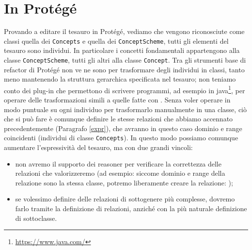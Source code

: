 \section{In Protégé}
Provando a editare il tesauro in Protégé, vediamo che vengono riconosciute come classi quella dei \verb|Concepts| e quella dei \verb|ConceptScheme|, tutti gli elementi del tesauro sono individui. In particolare i concetti fondamentali appartengono alla classe \verb|ConceptScheme|, tutti gli altri alla classe \verb|Concept|. Tra gli strumenti base di refactor di Protégé non ve ne sono per trasformare degli individui in classi, tanto meno mantenendo la struttura gerarchica specificata nel tesauro; non teniamo conto dei plug-in che permettono di scrivere programmi, ad esempio in java\footnote{\url{https://www.java.com/}}, per operare delle trasformazioni simili a quelle fatte con \cduce. Senza voler operare in modo puntuale su ogni individuo per trasformarlo manualmente in una classe, ciò che si può fare è comunque definire le stesse relazioni che abbiamo accennato precedentemente (Paragrafo \ref{expr}), che avranno in questo caso dominio e range coincidenti (individui di classe \verb|Concepts|). In questo modo possiamo comunque aumentare l'espressività del tesauro, ma con due grandi vincoli:
\begin{itemize}
	\item non avremo il supporto dei reasoner per verificare la correttezza delle relazioni che valorizzeremo (ad esempio: siccome dominio e range della relazione  sono la stessa classe, potremo liberamente creare la relazione: );
	\item se volessimo definire delle relazioni di sottogenere più complesse, dovremo farlo tramite la definizione di relazioni, anziché con la più naturale definizione di sottoclasse.
\end{itemize}
